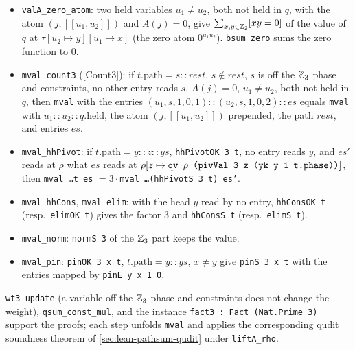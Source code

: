 \begin{theorem}\label{thm:lean-pathsum-mixed-steps}
\begin{itemize}
\item \textnormal{\texttt{valA\_zero\_atom}}: two held variables $u_1\ne u_2$, both not held in $q$, with the atom
  $(j,[[u_1,u_2]])$ and $A(j)=0$, give $\sum_{x,y\in\mathbb{Z}_{2}}[xy=0]$ of the value of $q$ at
  $\tau[u_2\mapsto y][u_1\mapsto x]$ (the zero atom $0^{u_1u_2}$). \textnormal{\texttt{bsum\_zero}} sums the zero
  function to $0$.
\item \textnormal{\texttt{mval\_count3}} ([Count3]): if $t.\mathrm{path}=s::rest$, $s\notin rest$, $s$ is off the $\mathbb{Z}_{3}$ phase
  and constraints, no other entry reads $s$, $A(j)=0$, $u_1\ne u_2$, both not held in $q$, then
  \textnormal{\texttt{mval}} with the entries $(u_1,s,1,0,1)::(u_2,s,1,0,2)::es$ equals \textnormal{\texttt{mval}} with
  $u_1::u_2::q.\mathrm{held}$, the atom $(j,[[u_1,u_2]])$ prepended, the path $rest$, and entries $es$.
\item \textnormal{\texttt{mval\_hhPivot}}: if $t.\mathrm{path}=y::z::ys$, \textnormal{\texttt{hhPivotOK 3 t}}, no entry reads $y$, and
  $es'$ reads at $\rho$ what $es$ reads at $\rho[z\mapsto\textnormal{\texttt{qv \ensuremath{\rho} (pivVal 3 z (yk y 1 t.phase))}}]$, then
  \textnormal{\texttt{mval \ldots t es}} $=3\cdot$\textnormal{\texttt{mval \ldots (hhPivotS 3 t) es'}}.
\item \textnormal{\texttt{mval\_hhCons}}, \textnormal{\texttt{mval\_elim}}: with the head $y$ read by no entry,
  \textnormal{\texttt{hhConsOK t}} (resp.\ \textnormal{\texttt{elimOK t}}) gives the factor $3$ and \textnormal{\texttt{hhConsS t}}
  (resp.\ \textnormal{\texttt{elimS t}}).
\item \textnormal{\texttt{mval\_norm}}: \textnormal{\texttt{normS 3}} of the $\mathbb{Z}_{3}$ part keeps the value.
\item \textnormal{\texttt{mval\_pin}}: \textnormal{\texttt{pinOK 3 x t}}, $t.\mathrm{path}=y::ys$, $x\ne y$ give
  \textnormal{\texttt{pinS 3 x t}} with the entries mapped by \textnormal{\texttt{pinE y x 1 0}}.
\end{itemize}
\textnormal{\texttt{wt3\_update}} (a variable off the $\mathbb{Z}_{3}$ phase and constraints does not change the weight),
\textnormal{\texttt{qsum\_const\_mul}}, and the instance \textnormal{\texttt{fact3 : Fact (Nat.Prime 3)}} support the
proofs; each step unfolds \textnormal{\texttt{mval}} and applies the corresponding qudit soundness theorem of
\cref{sec:lean-pathsum-qudit} under \textnormal{\texttt{liftA\_rho}}.
\end{theorem}

